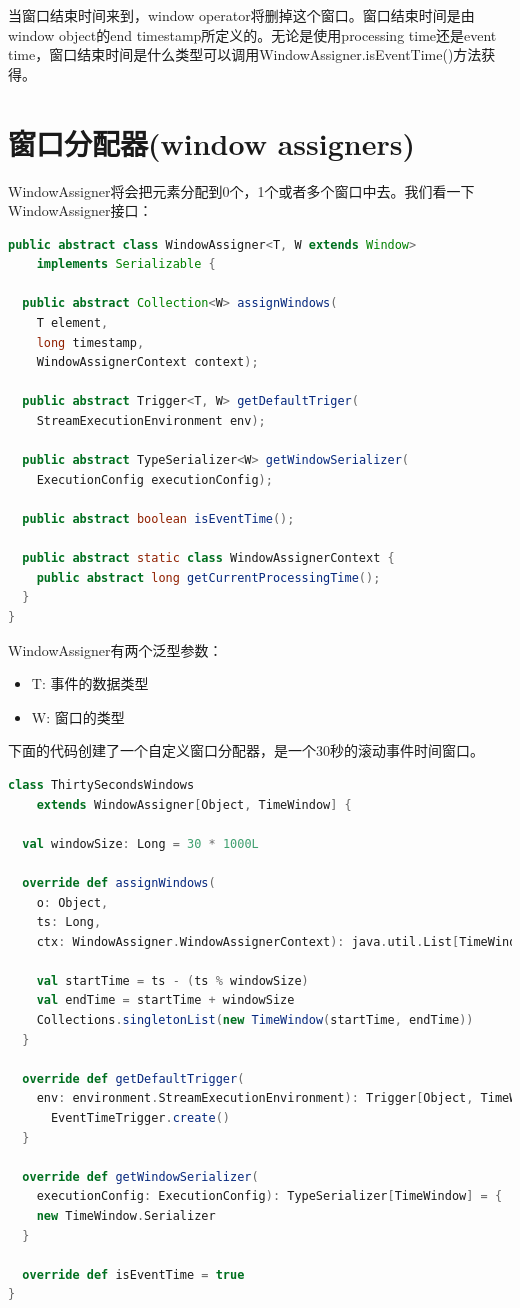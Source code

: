 \documentclass[oneside]{ctexbook}
\begin{document}
当窗口结束时间来到，window operator将删掉这个窗口。窗口结束时间是由window object的end timestamp所定义的。无论是使用processing time还是event time，窗口结束时间是什么类型可以调用WindowAssigner.isEventTime()方法获得。

\section{窗口分配器(window assigners)}

WindowAssigner将会把元素分配到0个，1个或者多个窗口中去。我们看一下WindowAssigner接口：

\begin{lstlisting}[language=java]
public abstract class WindowAssigner<T, W extends Window>
    implements Serializable {

  public abstract Collection<W> assignWindows(
    T element,
    long timestamp,
    WindowAssignerContext context);

  public abstract Trigger<T, W> getDefaultTriger(
    StreamExecutionEnvironment env);

  public abstract TypeSerializer<W> getWindowSerializer(
    ExecutionConfig executionConfig);

  public abstract boolean isEventTime();

  public abstract static class WindowAssignerContext {
    public abstract long getCurrentProcessingTime();
  }
}
\end{lstlisting}

WindowAssigner有两个泛型参数：

\begin{itemize}
  \item T: 事件的数据类型
  \item W: 窗口的类型
\end{itemize}

下面的代码创建了一个自定义窗口分配器，是一个30秒的滚动事件时间窗口。

\begin{lstlisting}[language=scala]
class ThirtySecondsWindows
    extends WindowAssigner[Object, TimeWindow] {

  val windowSize: Long = 30 * 1000L

  override def assignWindows(
    o: Object,
    ts: Long,
    ctx: WindowAssigner.WindowAssignerContext): java.util.List[TimeWindow] = {

    val startTime = ts - (ts % windowSize)
    val endTime = startTime + windowSize
    Collections.singletonList(new TimeWindow(startTime, endTime))
  }

  override def getDefaultTrigger(
    env: environment.StreamExecutionEnvironment): Trigger[Object, TimeWindow] = {
      EventTimeTrigger.create()
  }

  override def getWindowSerializer(
    executionConfig: ExecutionConfig): TypeSerializer[TimeWindow] = {
    new TimeWindow.Serializer
  }

  override def isEventTime = true
}
\end{lstlisting}
\end{document}
